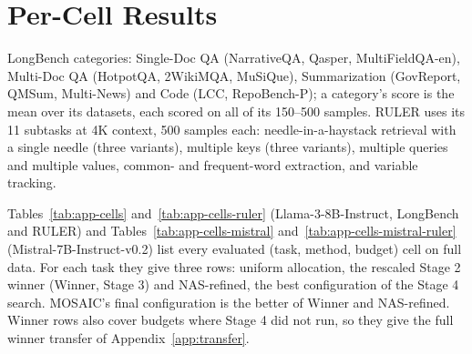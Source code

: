 \clearpage
\appendix

\section{Per-Cell Results}
\label{app:cells}


LongBench categories: Single-Doc QA (NarrativeQA, Qasper, MultiFieldQA-en), Multi-Doc QA (HotpotQA, 2WikiMQA, MuSiQue), Summarization (GovReport, QMSum, Multi-News) and Code (LCC, RepoBench-P); a category's score is the mean over its datasets, each scored on all of its 150--500 samples. RULER uses its 11 subtasks at 4K context, 500 samples each: needle-in-a-haystack retrieval with a single needle (three variants), multiple keys (three variants), multiple queries and multiple values, common- and frequent-word extraction, and variable tracking.

Tables~\ref{tab:app-cells} and~\ref{tab:app-cells-ruler} (Llama-3-8B-Instruct, LongBench and RULER) and Tables~\ref{tab:app-cells-mistral} and~\ref{tab:app-cells-mistral-ruler} (Mistral-7B-Instruct-v0.2) list every evaluated (task, method, budget) cell on full data. For each task they give three rows: uniform allocation, the rescaled Stage 2 winner (Winner, Stage 3) and NAS-refined, the best configuration of the Stage 4 search. MOSAIC's final configuration is the better of Winner and NAS-refined. Winner rows also cover budgets where Stage 4 did not run, so they give the full winner transfer of Appendix~\ref{app:transfer}.


